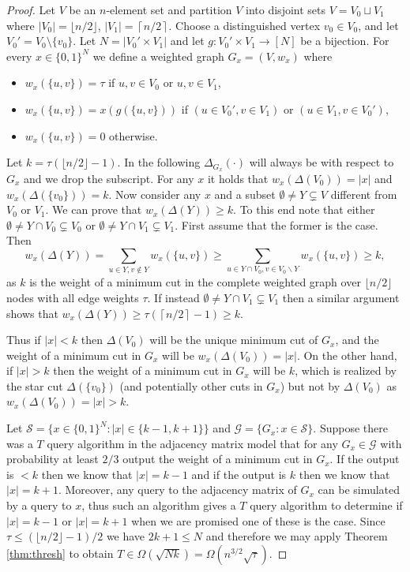 \documentclass[10pt,a4paper]{article}
\newcommand{\Scal}{\mathcal{S}}
\newcommand{\Gcal}{\mathcal{G}}
\newcommand{\floor}[1]{\lfloor #1 \rfloor}
\newcommand{\ceil}[1]{\left\lceil #1 \right\rceil}
\newcommand{\1}{\mathbf{1}}
\theoremstyle{definition}
\begin{document}
\begin{proof}
Let $V$ be an $n$-element set and partition $V$ into disjoint sets $V = V_0 \sqcup V_1$ where $|V_0| = \floor{n/2}$, $|V_1| = \ceil{n/2}$.  Choose a distinguished vertex $v_0 \in V_0$, and let $V_0' = V_0 \setminus \{v_0\}$. 
Let $N = |V_0' \times V_1|$ and let $g : V_0' \times V_1 \rightarrow [N]$ be a bijection.  For every $x \in \{0,1\}^N$ we define a weighted graph $G_x = (V,w_x)$ where
\begin{itemize}
\item
$w_x(\{u,v\}) = \tau$ if $u,v \in V_0$ or $u,v \in V_1$,
\item
$w_x(\{u,v\}) = x(g(\{u,v\}))$ if $(u \in V_0', v \in V_1)$ or $(u \in V_1, v \in V_0')$,
\item
$w_x(\{u,v\}) = 0$ otherwise.
\end{itemize}
Let $k = \tau (\floor{n/2}- 1)$.  In the following $\Delta_{G_x}(\cdot)$ will always be with respect to $G_x$ and we drop the subscript.
For any $x$ it holds that $w_x(\Delta(V_0)) = |x|$ and $w_x(\Delta(\{v_0\})) = k$.
Now consider any $x$ and a subset $\emptyset \neq Y \subsetneq V$ different from $V_0$ or $V_1$.  We can prove that $w_x(\Delta(Y)) \ge k$.  To this end note that either 
$\emptyset \neq Y \cap V_0 \subsetneq V_0$ or $\emptyset \neq Y \cap V_1 \subsetneq V_1$.  First assume that the former is the case.  Then
\[
w_x(\Delta(Y))
= \sum_{u \in Y, v \notin Y} w_x(\{u,v\})
\ge \sum_{u \in Y \cap V_0, v \in V_0 \backslash Y} w_x(\{u,v\})
\ge k,
\]
as $k$ is the weight of a minimum cut in the complete weighted graph over $\floor{n/2}$ nodes with all edge weights $\tau$.  If instead $\emptyset \neq Y \cap V_1 \subsetneq V_1$ 
then a similar argument shows that $w_x(\Delta(Y)) \ge \tau (\ceil{n/2}-1) \ge k$.

Thus if $|x| < k$ then $\Delta(V_0)$ will be the unique minimum cut of $G_x$, and the weight of a minimum cut in $G_x$ will be $w_x(\Delta(V_0)) = |x|$. On the other hand, if 
$|x| > k$ then the weight of a minimum cut in $G_x$ will be $k$, which is realized by the star cut $\Delta(\{v_0\})$ (and potentially other cuts in $G_x$) but 
not by $\Delta(V_0)$ as $w_x(\Delta(V_0)) = |x| > k$.

Let $\Scal = \{x \in \{0,1\}^N : |x| \in \{k-1,k+1\} \}$ and $\Gcal = \{G_x : x \in \Scal\}$.  
Suppose there was a $T$ query algorithm in the adjacency matrix model that for any $G_x \in \Gcal$ with probability at least $2/3$ output the weight of a minimum cut in $G_x$.
If the output is $<k$ then we know that $|x| = k-1$ and if the output is $k$ then we know that $|x| = k+1$.  Moreover, any query to the adjacency matrix of $G_x$ can be simulated 
by a query to $x$, thus such an algorithm gives a $T$ query algorithm to determine if $|x| = k-1$ or $|x| = k+1$ when we are promised one of these is the case.  Since $\tau \le (\floor{n/2}-1)/2$ 
we have $2k+1 \le N$ and therefore we may apply Theorem \ref{thm:thresh} to obtain $T \in \Omega(\sqrt{N k}) = \Omega(n^{3/2}\sqrt{\tau})$.


\end{proof}
\end{document}
